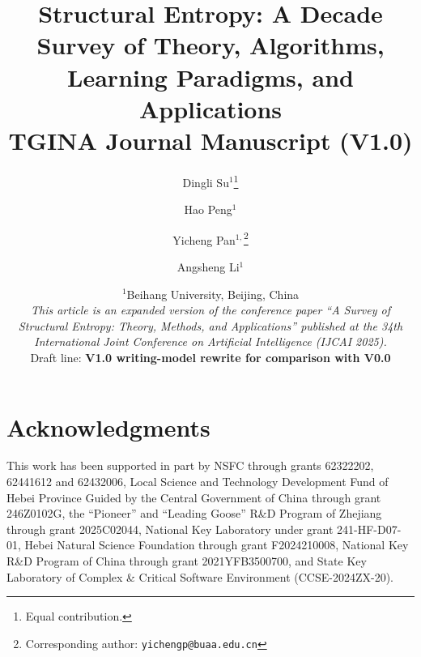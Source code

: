 \documentclass[12pt,a4paper]{article}
\title{%
  Structural Entropy: A Decade Survey of Theory, Algorithms,\\
  Learning Paradigms, and Applications\\
  \large TGINA Journal Manuscript (V1.0)
}
\author{%
  Dingli Su$^{1}$\thanks{Equal contribution.}
  \and
  Hao Peng$^{1}$
  \and
  Yicheng Pan$^{1,}$\thanks{Corresponding author: \texttt{yichengp@buaa.edu.cn}}
  \and
  Angsheng Li$^{1}$
}
\date{%
  $^1$Beihang University, Beijing, China\\[4pt]
  \small
  \emph{This article is an expanded version of the conference paper
  ``A Survey of Structural Entropy: Theory, Methods, and Applications''
  published at the 34th International Joint Conference on
  Artificial Intelligence (IJCAI 2025).}\\[4pt]
  \small Draft line: \textbf{V1.0 writing-model rewrite for comparison with V0.0}
}
\begin{document}
\maketitle
\thispagestyle{plain}












\section*{Acknowledgments}
This work has been supported in part by NSFC through grants 62322202, 62441612
and 62432006, Local Science and Technology Development Fund of Hebei Province
Guided by the Central Government of China through grant 246Z0102G, the
``Pioneer'' and ``Leading Goose'' R\&D Program of Zhejiang through grant
2025C02044, National Key Laboratory under grant 241-HF-D07-01, Hebei Natural
Science Foundation through grant F2024210008, National Key R\&D Program of China
through grant 2021YFB3500700, and State Key Laboratory of Complex \& Critical
Software Environment (CCSE-2024ZX-20).




\appendix

\end{document}
